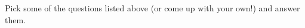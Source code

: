 \documentclass[handout,nooutcomes]{ximera}
\begin{document}
\begin{problem}
  Pick some of the questions listed above (or come up with your own!) and answer them.
\end{problem}






\end{document}
